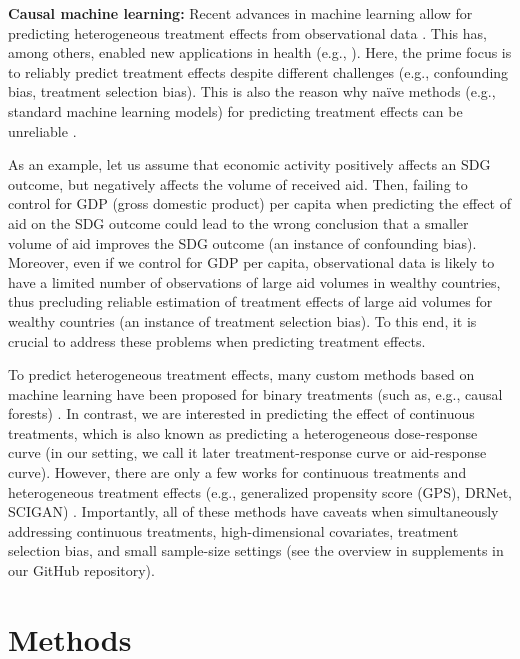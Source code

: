 \documentclass[sigconf]{acmart}
\begin{document}
\textbf{Causal machine learning:}
Recent advances in machine learning allow for predicting heterogeneous treatment effects from observational data \cite{Alaa2018, Feuerriegel2024}. This has, among others, enabled new applications in health (e.g., \cite{Liu2021,Kraus2023}). Here, the prime focus is to reliably predict treatment effects despite different challenges (e.g., confounding bias, treatment selection bias). This is also the reason why na{\"i}ve methods (e.g., standard machine learning models) for predicting treatment effects can be unreliable \cite{Shalit2017}. 

As an example, let us assume that economic activity positively affects an SDG outcome, but negatively affects the volume of received aid. Then, failing to control for GDP (gross domestic product) per capita when predicting the effect of aid on the SDG outcome could lead to the wrong conclusion that a smaller volume of aid improves the SDG outcome (an instance of confounding bias). Moreover, even if we control for GDP per capita, observational data is likely to have a limited number of observations of large aid volumes in wealthy countries, thus precluding reliable estimation of treatment effects of large aid volumes for wealthy countries (an instance of treatment selection bias). To this end, it is crucial to address these problems when predicting treatment effects. 

To predict heterogeneous treatment effects, many custom methods based on machine learning have been proposed for binary treatments (such as, e.g., causal forests) \cite{Johansson2016, Shalit2017, Yoon2018, Athey2019, Hatt2021}. In contrast, we are interested in predicting the effect of continuous treatments, which is also known as predicting a heterogeneous dose-response curve (in our setting, we call it later treatment-response curve or aid-response curve). However, there are only a few works for continuous treatments and heterogeneous treatment effects (e.g., generalized propensity score (GPS), DRNet, SCIGAN) \cite{Hirano2004, Schwab2020, Bica2020}. Importantly, all of these methods have caveats when simultaneously addressing continuous treatments, high-dimensional covariates, treatment selection bias, and small sample-size settings (see the overview in supplements in our GitHub repository). 

\section{Methods}
\label{sec:methods}
\end{document}
